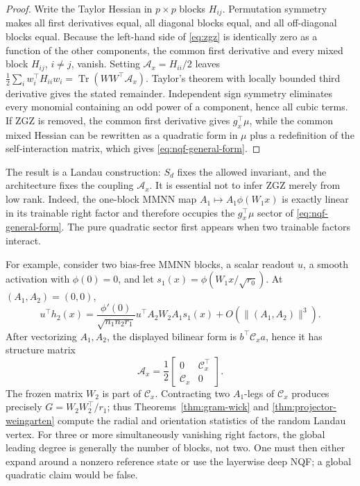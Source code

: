 \documentclass{article}
\newcommand{\Tr}{\operatorname{Tr}}
\begin{document}
\begin{proof}
Write the Taylor Hessian in \(p\times p\) blocks \(H_{ij}\).  Permutation
symmetry makes all first derivatives equal, all diagonal blocks equal, and
all off-diagonal blocks equal.  Because the left-hand side of
\eqref{eq:zgz} is identically zero as a function of the other components,
the common first derivative and every mixed block \(H_{ij}\), \(i\ne j\),
vanish.  Setting \(\mathscr A_x=H_{ii}/2\) leaves
\(\frac12\sum_iw_i^\top H_{ii}w_i=\Tr(WW^\top\mathscr A_x)\).
Taylor's theorem with locally bounded third derivative gives the stated
remainder.  Independent sign symmetry eliminates every monomial containing
an odd power of a component, hence all cubic terms.  If ZGZ is removed, the
common first derivative gives \(g_x^\top\mu\), while the common mixed Hessian
can be rewritten as a quadratic form in \(\mu\) plus a redefinition of the
self-interaction matrix, which gives \eqref{eq:nqf-general-form}.
\end{proof}

The result is a Landau construction: \(S_d\) fixes the allowed invariant,
and the architecture fixes the coupling \(\mathscr A_x\).  It is essential
not to infer ZGZ merely from low rank.  Indeed, the one-block MMNN map
\(A_1\mapsto A_1\phi(W_1x)\) is exactly linear in its trainable right factor
and therefore occupies the \(g_x^\top\mu\) sector of
\eqref{eq:nqf-general-form}.  The pure quadratic sector first appears when
two trainable factors interact.

For example, consider two bias-free MMNN blocks, a scalar readout \(u\), a
smooth activation with \(\phi(0)=0\), and let
\(s_1(x)=\phi(W_1x/\sqrt{r_0})\).  At \((A_1,A_2)=(0,0)\),
\begin{equation}
u^\top h_2(x)=
\frac{\phi'(0)}{\sqrt{n_1n_2r_1}}
u^\top A_2W_2A_1s_1(x)
+O(\|(A_1,A_2)\|^3).
\label{eq:two-block-nqf}
\end{equation}
After vectorizing \(A_1,A_2\), the displayed bilinear form is
\(b^\top\mathscr C_xa\), hence it has structure matrix
\begin{equation}
\mathscr A_x=\frac12
\begin{bmatrix}0&\mathscr C_x^\top\\
\mathscr C_x&0\end{bmatrix}.
\label{eq:mmnn-nqf-structure}
\end{equation}
The frozen matrix \(W_2\) is part of \(\mathscr C_x\).  Contracting two
\(A_1\)-legs of \(\mathscr C_x\) produces precisely
\(G=W_2W_2^\top/r_1\); thus Theorems~\ref{thm:gram-wick} and
\ref{thm:projector-weingarten} compute the radial and orientation statistics
of the random Landau vertex.  For three or more simultaneously vanishing
right factors, the global leading degree is generally the number of blocks,
not two.  One must then either expand around a nonzero reference state or use
the layerwise deep NQF; a global quadratic claim would be false.
\end{document}
